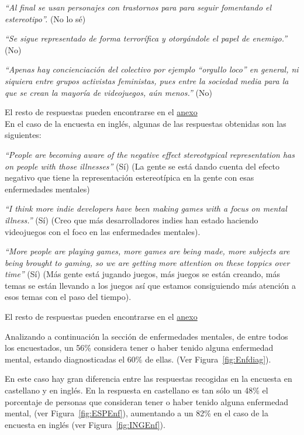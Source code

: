 \documentclass[12pt, a4paper,twoside,titlepage]{book}
\begin{document}
\textit{``Al final se usan personajes con trastornos para para seguir fomentando el estereotipo''.} (No lo sé) 

\textit{``Se sigue representado de forma terrorífica y otorgándole el papel de enemigo.''} (No)

\textit{``Apenas hay concienciación del colectivo por ejemplo ``orgullo loco'' en general, ni siquiera entre grupos activistas feministas, pues entre la sociedad media para la que se crean la mayoría de videojuegos, aún menos.''} (No) 

El resto de respuestas pueden encontrarse en el   \hyperref[mejorCastellano]{anexo}\\


 
En el caso de la encuesta en inglés, algunas de las respuestas obtenidas son las siguientes: 

\textit{``People are becoming aware of the negative effect stereotypical representation has on people with those illnesses''} (Sí) (La gente se está dando cuenta del efecto negativo que tiene la representación estereotípica en la gente con esas enfermedades mentales)

\textit{``I think more indie developers have been making games with a focus on mental illness.''} (Sí) (Creo que más desarrolladores indies han estado haciendo videojuegos con el foco en las enfermedades mentales).

\textit{``More people are playing games, more games are being made, more subjects are being brought to gaming, so we are getting more attention on these toppics over time''} (Sí) (Más gente está jugando juegos, más juegos se están creando, más temas se están llevando a los juegos así que estamos consiguiendo más atención a esos temas con el paso del tiempo).

El resto de respuestas pueden encontrarse en el \hyperref[mejorIngles]{anexo}



Analizando a continuación la sección de enfermedades mentales, de entre todos los encuestados, un 56\% considera tener o haber tenido alguna enfermedad mental, estando diagnosticadas el 60\% de ellas. (Ver Figura~\ref{fig:Enfdiag}). 

En este caso hay gran diferencia entre las respuestas recogidas en la encuesta en castellano y en inglés. En la respuesta en castellano es tan sólo un 48\% el porcentaje de personas que consideran tener o haber tenido alguna enfermedad mental, (ver Figura~\ref{fig:ESPEnf}), aumentando a un 82\% en el caso de la encuesta en inglés (ver Figura~\ref{fig:INGEnf}). 
\end{document}

